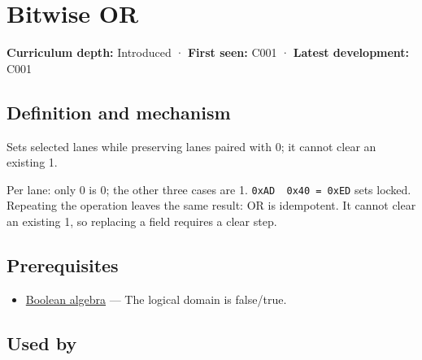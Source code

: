 \hypertarget{appendix-a427ce8ce8a6}{}\label{referencestart:appendix-a427ce8ce8a6}
\section{Bitwise OR}\label{appendix-a427ce8ce8a6-bitwise-or}

\hypertarget{appendix-a427ce8ce8a6-bitwise-or}{}

\textbf{Curriculum depth:} Introduced · \textbf{First seen:} C001 · \textbf{Latest development:} C001

\begin{allmightroledefinition}

\subsection{Definition and mechanism}\label{appendix-a427ce8ce8a6-definition-and-mechanism}

\hypertarget{appendix-a427ce8ce8a6-definition-and-mechanism}{}

Sets selected lanes while preserving lanes paired with 0; it cannot clear an existing 1.

\end{allmightroledefinition}

Per lane: only 0 is 0; the other three cases are 1. \texttt{0xAD\ \textbar{}\ 0x40\ =\ 0xED} sets locked. Repeating the operation leaves the same result: OR is idempotent. It cannot clear an existing 1, so replacing a field requires a clear step.

\subsection{Prerequisites}\label{appendix-a427ce8ce8a6-prerequisites}

\hypertarget{appendix-a427ce8ce8a6-prerequisites}{}

\begin{itemize}
\tightlist
\item
  \hyperref[appendix-24475e1596a8]{Boolean algebra} --- The logical domain is false/true.
\end{itemize}

\subsection{Used by}\label{appendix-a427ce8ce8a6-used-by}

\hypertarget{appendix-a427ce8ce8a6-used-by}{}

